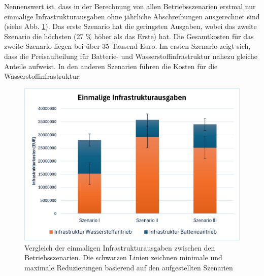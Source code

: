 Nennenswert ist, dass in der Berechnung von allen Betriebsszenarien erstmal nur einmalige Infrastrukturausgaben 
ohne jährliche Abschreibungen ausgerechnet sind (siehe Abb. \ref{res_infr_betriebsszenarien}). 
Das erste Szenario hat die geringsten Ausgaben, wobei das zweite Szenario die höchsten (27 \% höher als das Erste) hat.
Die Gesamtkosten für das zweite Szenario liegen bei über 35 Tausend Euro. %
Im ersten Szenario zeigt sich, dass die Preisaufteilung für Batterie- und Wasserstoffinfrastruktur nahezu gleiche Anteile aufweist.
In den anderen Szenarien führen die Kosten für die Wasserstoffinfrastruktur.\\
\begin{figure}[h]
	\centering
	\includegraphics[width=0.8\linewidth]{Bilder/Infr_Szenarien.png}
	\caption[Vergleich der einmaligen Infrastrukturausgaben zwischen den Betriebsszenarien]{Vergleich der einmaligen Infrastrukturausgaben zwischen den Betriebsszenarien. Die schwarzen Linien
	zeichnen minimale und maximale Reduzierungen basierend auf den aufgestellten Szenarien}
	\label{res_infr_betriebsszenarien}
\end{figure}

